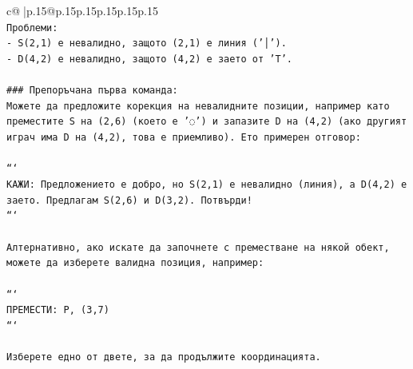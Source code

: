 \documentclass{article}
\begin{document}
{\begin{supertabular}{c@{$\;$}|p{.15\linewidth}@{}p{.15\linewidth}p{.15\linewidth}p{.15\linewidth}p{.15\linewidth}p{.15\linewidth}}
{{{\\ 
\texttt{Проблеми:} \\
\texttt{{-} S(2,1) е невалидно, защото (2,1) е линия ('│').} \\
\texttt{{-} D(4,2) е невалидно, защото (4,2) е заето от 'T'.} \\
\\ 
\texttt{\#\#\# Препоръчана първа команда:} \\
\texttt{Можете да предложите корекция на невалидните позиции, например като преместите S на (2,6) (което е '◌') и запазите D на (4,2) (ако другият играч има D на (4,2), това е приемливо). Ето примерен отговор:} \\
\\ 
\texttt{```} \\
\texttt{КАЖИ: Предложението е добро, но S(2,1) е невалидно (линия), а D(4,2) е заето. Предлагам S(2,6) и D(3,2). Потвърди!} \\
\texttt{```} \\
\\ 
\texttt{Алтернативно, ако искате да започнете с преместване на някой обект, можете да изберете валидна позиция, например:} \\
\\ 
\texttt{```} \\
\texttt{ПРЕМЕСТИ: P, (3,7)} \\
\texttt{```} \\
\\ 
\texttt{Изберете едно от двете, за да продължите координацията.} \\
            }
        }
    }
     \\ \\


\end{supertabular}}
\end{document}
